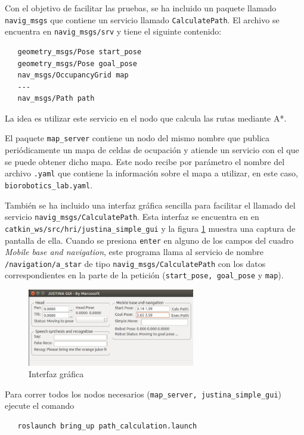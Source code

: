 \documentclass[letterpaper,12pt]{article}
\begin{document}
Con el objetivo de facilitar las pruebas, se ha incluido un paquete llamado \texttt{navig\_msgs} que contiene un servicio llamado \texttt{CalculatePath}. El archivo se encuentra en \texttt{navig\_msgs/srv} y tiene el siguinte contenido:
\begin{verbatim}
   geometry_msgs/Pose start_pose
   geometry_msgs/Pose goal_pose
   nav_msgs/OccupancyGrid map
   ---
   nav_msgs/Path path
\end{verbatim}
La idea es utilizar este servicio en el nodo que calcula las rutas mediante A*. 

El paquete \texttt{map\_server} contiene un nodo del mismo nombre que publica periódicamente un mapa de celdas de ocupación y atiende un servicio con el que se puede obtener dicho mapa. Este nodo recibe por parámetro el nombre del archivo \texttt{.yaml} que contiene la información sobre el mapa a utilizar, en este caso, \texttt{biorobotics\_lab.yaml}. 

También se ha incluido una interfaz gráfica sencilla para facilitar el llamado del servicio \texttt{navig\_msgs/CalculatePath}. Esta interfaz se encuentra en en \texttt{catkin\_ws/src/hri/justina\_simple\_gui} y la figura \ref{fig:gui} muestra una captura de pantalla de ella. Cuando se presiona \texttt{enter} en alguno de los campos del cuadro \textit{Mobile base and navigation}, este programa llama al servicio de nombre \texttt{/navigation/a\_star} de tipo \texttt{navig\_msgs/CalculatePath} con los datos correspondientes en la parte de la petición (\texttt{start\_pose, goal\_pose} y \texttt{map}).
\begin{figure}
\centering
\includegraphics[width=0.65\textwidth]{Figures/gui.jpg}
\caption{Interfaz gráfica}
\label{fig:gui}
\end{figure}

Para correr todos los nodos necesarios (\texttt{map\_server, justina\_simple\_gui}) ejecute el comando
\begin{verbatim}
   roslaunch bring_up path_calculation.launch
\end{verbatim}
\end{document}
